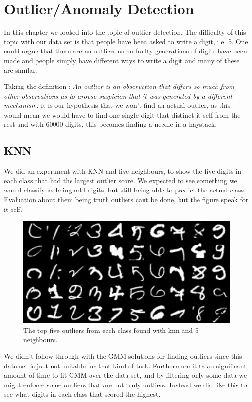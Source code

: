 \chapter{Outlier/Anomaly Detection}

In this chapter we looked into the topic of outlier detection. The difficulty of this topic with our data set is that people have been asked to write a digit, i.e. 5. One could argue that there are no outliers as no faulty generations of digits have been made and people simply have different ways to write a digit and many of these are similar. 

Taking the definition : \textit{An outlier is an observation that differs so much from other observations as to arouse suspicion that it was generated by a different mechanism.} it is our hypothesis that we won't find an actual outlier, as this would mean we would have to find one single digit that distinct it self from the rest and with 60000 digits, this becomes finding a needle in a haystack.

\section{KNN}
We did an experiment with KNN and five neighbours, to show the five digits in each class that had the largest outlier score. We expected to see something we would classify as being odd digits, but still being able to predict the actual class. Evaluation about them being truth outliers cant be done, but the figure speak for it self.   

\begin{figure}[H]
\centering
\includegraphics[width=0.6\linewidth]{code/knn_5_outlier}
\caption{The top five outliers from each class found with knn and 5 neighbours.}
\label{fig:outlier_knn}
\end{figure}

We didn't follow through with the GMM solutions for finding outliers since this data set is just not suitable for that kind of task. Furthermore it takes significant amount of time to fit GMM over the data set, and by filtering only some data we might enforce some outliers that are not truly outliers. Instead we did like this to see what digits in each class that scored the highest.